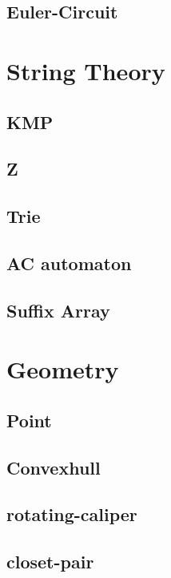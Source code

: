 \documentclass[a4paper,10pt,twocolumn,oneside]{article}
\begin{document}
\subsection{Euler-Circuit}


\section{String Theory}
\subsection{KMP}

\subsection{Z}

\subsection{Trie}

\subsection{AC automaton}

\subsection{Suffix Array}


\section{Geometry}
\subsection{Point}

\subsection{Convexhull}

\subsection{rotating-caliper}

\subsection{closet-pair}

\end{document}
